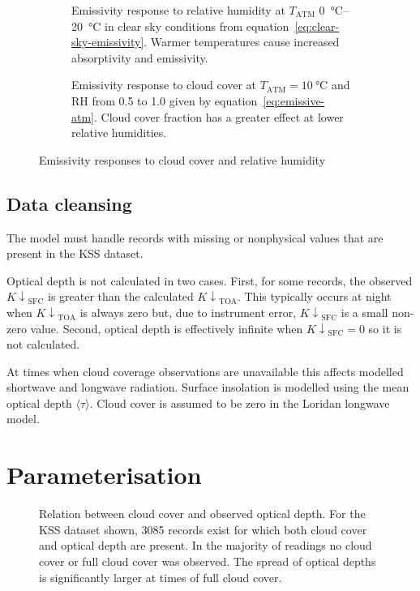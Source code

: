 \documentclass[a4paper,titlepage, twoside]{report}
\newcommand\Kdownsfc{{K\!\!\downarrow}_\mathrm{SFC}}
\newcommand\Kdowntoa{{K\!\!\downarrow}_\mathrm{TOA}}
\begin{document}
\begin{figure}
\centering
\begin{subfigure}{0.48\textwidth}

\caption{Emissivity response to relative humidity at $T_\mathrm{ATM}$ \SIrange{0}{20}{\celsius} in clear sky conditions from equation~\ref{eq:clear-sky-emissivity}.  Warmer temperatures cause increased absorptivity and emissivity.}
\end{subfigure}
\hfill
\begin{subfigure}{0.48\textwidth}

\caption{Emissivity response to cloud cover at $T_\mathrm{ATM} = \SI{10}{\celsius}$ and RH from 0.5 to 1.0 given by equation~\ref{eq:emissive-atm}. Cloud cover fraction has a greater effect at lower relative humidities.}
\end{subfigure}
\caption{Emissivity responses to cloud cover and relative humidity}
\label{fig:emissivity-response}
\end{figure}

\subsection{Data cleansing}
The model must handle records with missing or nonphysical values that are present in the KSS dataset.  

Optical depth is not calculated in two cases.  First, for some records, the observed $\Kdownsfc$ is greater than the calculated $\Kdowntoa$.  This typically occurs at night when $\Kdowntoa$ is always zero but, due to instrument error, $\Kdownsfc$ is a small non-zero value.  Second, optical depth is effectively infinite when $\Kdownsfc = 0$ so it is not calculated.

At times when cloud coverage observations are unavailable this affects modelled shortwave and longwave radiation.  Surface insolation is modelled using the mean optical depth $\langle \tau \rangle$.  Cloud cover is assumed to be zero in the Loridan longwave model.

\section{Parameterisation}
\label{sec:parameterisation}

\begin{figure}
\centering

\caption{Relation between cloud cover and observed optical depth.  For the KSS dataset shown, 3085 records exist for which both cloud cover and optical depth are present.  In the majority of readings no cloud cover or full cloud cover was observed.  The spread of optical depths is significantly larger at times of full cloud cover.}
\label{fig:cloud-tau-fit}
\end{figure}
\end{document}
